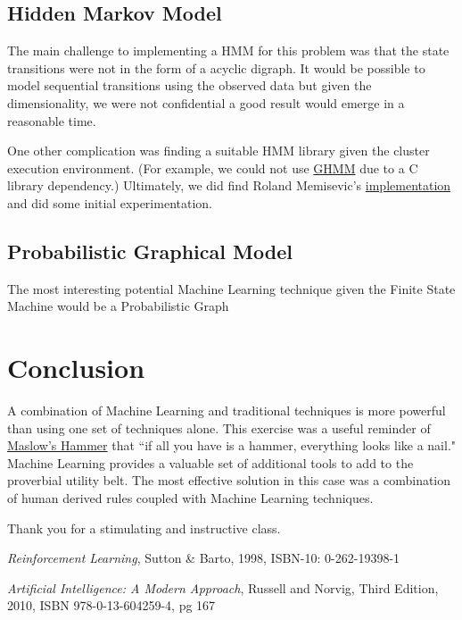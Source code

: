 \documentclass[11pt, oneside]{article}   	%
\begin{document}
\subsection{Hidden Markov Model}
The main challenge to implementing a HMM for this problem was that the state transitions were not in the form of a acyclic digraph. It would be possible to model sequential transitions using the observed data but given the dimensionality, we were not confidential a good result would emerge in a reasonable time.

One other complication was finding a suitable HMM library given the cluster execution environment. (For example, we could not use \href{www.ghmm.org}{GHMM} due to a C library dependency.) Ultimately, we did find Roland Memisevic's \href{http://www.iro.umontreal.ca/~memisevr/code/hmm.py}{implementation} and did some initial experimentation.

\subsection{Probabilistic Graphical Model}

The most interesting potential Machine Learning technique given the Finite State Machine would be a Probabilistic Graph

\section{Conclusion}
A combination of Machine Learning and traditional techniques is more powerful than using one set of techniques alone. This exercise was a useful reminder of \href{http://en.wikipedia.org/wiki/Law_of_the_instrument}{Maslow's Hammer} that  ``if all you have is a hammer, everything looks like a nail." Machine Learning provides a valuable set of additional tools to add to the proverbial utility belt. The most effective solution in this case was a combination of human derived rules coupled with Machine Learning techniques. 

Thank you for a stimulating and instructive class.

\begin{thebibliography}{1}

 \emph{Reinforcement Learning}, Sutton \& Barto, 1998, ISBN-10: 0-262-19398-1
 
 \emph{Artificial Intelligence: A Modern Approach}, Russell and Norvig, Third Edition, 2010, ISBN 978-0-13-604259-4, pg 167
 
  \end{thebibliography}
\end{document}
